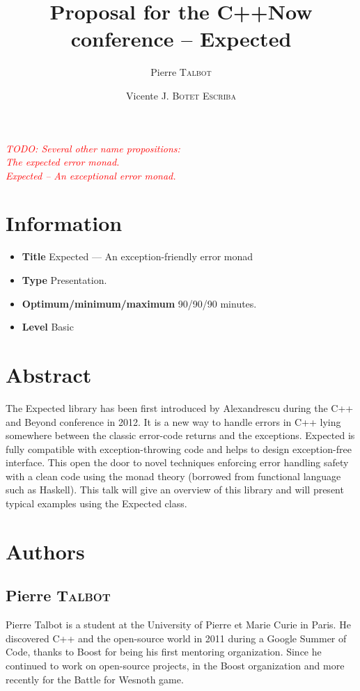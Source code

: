 \documentclass[a4paper,10pt]{article}
\title{Proposal for the C++Now conference – Expected}
\author{Pierre T\textsc{albot} \and Vicente J. B\textsc{otet} E\textsc{scriba}}
\newcommand{\todo}[1]{\emph{\textcolor{red}{TODO: #1}}}
\begin{document}
\maketitle
\todo{Several other name propositions:\\
The expected error monad.\\
Expected – An exceptional error monad.\\}
\section{Information}

\begin{itemize}
\item \textbf{Title} Expected — An exception-friendly error monad
\item \textbf{Type} Presentation.
\item \textbf{Optimum/minimum/maximum} 90/90/90 minutes.
\item \textbf{Level} Basic
\end{itemize}

\section{Abstract}

The Expected library has been first introduced by Alexandrescu during the C++ and Beyond conference in 2012. It is a new way to handle errors in C++ lying somewhere between the classic error-code returns and the exceptions. Expected is fully compatible with exception-throwing code and helps to design exception-free interface. This open the door to novel techniques enforcing error handling safety with a clean code using the monad theory (borrowed from functional language such as Haskell). This talk will give an overview of this library and will present typical examples using the Expected class.

\section{Authors}

\subsection{Pierre T\textsc{albot}}

Pierre Talbot is a student at the University of Pierre et Marie Curie in Paris. He discovered C++ and the open-source world in 2011 during a Google Summer of Code, thanks to Boost for being his first mentoring organization. Since he continued to work on open-source projects, in the Boost organization and more recently for the Battle for Wesnoth game.
\end{document}
